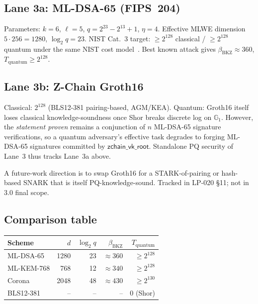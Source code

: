 \documentclass[11pt]{article}
\begin{document}
\subsection{Lane 3a: ML-DSA-65 (FIPS~204)}

Parameters: $k = 6$, $\ell = 5$, $q = 2^{23} - 2^{13} + 1$, $\eta = 4$.
Effective MLWE dimension $5 \cdot 256 = 1280$, $\log_2 q = 23$.
NIST Cat.~3 target: $\geq 2^{128}$ classical / $\geq 2^{128}$ quantum
under the same NIST cost model~\cite{nist-pqc-cost}.  Best known attack
gives $\beta_{\mathrm{BKZ}} \approx 360$, $T_{\mathrm{quantum}} \geq
2^{128}$.

\subsection{Lane 3b: Z-Chain Groth16}

Classical: $2^{128}$ (BLS12-381 pairing-based, AGM/KEA).  Quantum:
Groth16 itself loses classical knowledge-soundness once Shor breaks
discrete log on $\mathbb{G}_1$.  However, the \emph{statement proven}
remains a conjunction of $n$ ML-DSA-65 signature verifications, so a
quantum adversary's effective task degrades to forging ML-DSA-65
signatures committed by $\mathsf{zchain\_vk\_root}$.  Standalone PQ
security of Lane~3 thus tracks Lane~3a above.

A future-work direction is to swap Groth16 for a STARK-of-pairing or
hash-based SNARK that is itself PQ-knowledge-sound.  Tracked in
LP-020 \S11; not in 3.0 final scope.

\subsection{Comparison table}

\begin{center}
\begin{tabular}{lrrrr}
\toprule
\textbf{Scheme} & $d$ & $\log_2 q$ & $\beta_{\text{BKZ}}$ &
  $T_{\text{quantum}}$ \\
\midrule
ML-DSA-65   & 1280 & 23 & $\approx 360$
  & $\geq 2^{128}$ \\
ML-KEM-768  & 768  & 12 & $\approx 340$
  & $\geq 2^{128}$ \\
Corona    & 2048 & 48 & $\approx 430$
  & $\geq 2^{130}$ \\
BLS12-381   & --   & -- & --
  & $0$ (Shor) \\
\bottomrule
\end{tabular}
\end{center}
\end{document}
